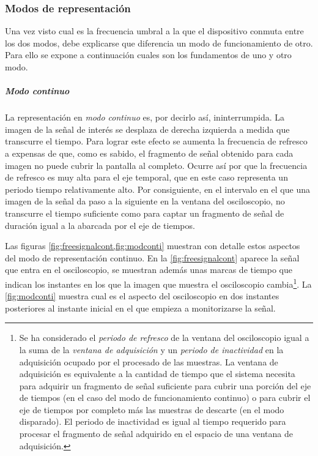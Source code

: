 \subsubsection{Modos de representación}

Una vez visto cual es la frecuencia umbral a la que el dispositivo conmuta
entre los dos modos, debe explicarse que diferencia un modo de
funcionamiento de otro. Para ello se expone a continuación cuales son los
fundamentos de uno y otro modo.


\subparagraph{Modo continuo}

La representación en \emph{modo continuo} es, por decirlo así,
ininterrumpida. La imagen de la señal de interés se desplaza de derecha
izquierda a medida que transcurre el tiempo. Para lograr este efecto se
aumenta la frecuencia de refresco a expensas de que, como es sabido, el
fragmento de señal obtenido para cada imagen no puede cubrir la pantalla al
completo. Ocurre así por que la frecuencia de refresco es muy alta para el
eje temporal, que en este caso representa un periodo tiempo relativamente
alto. Por consiguiente, en el intervalo en el que una imagen de la señal da
paso a la siguiente en la ventana del osciloscopio, no transcurre el tiempo
suficiente como para captar un fragmento de señal de duración igual a la
abarcada por el eje de tiempos.

Las figuras \cref{fig:freesignalcont,fig:modconti} muestran con detalle
estos aspectos del modo de representación continuo. En la
\cref{fig:freesignalcont} aparece la señal que entra en el osciloscopio, se
muestran además unas marcas de tiempo que indican los instantes en los que
la imagen que muestra el osciloscopio cambia\footnote{Se ha considerado el
\emph{periodo de refresco} de la ventana del osciloscopio igual a la suma
de la \emph{ventana de adquisición} y un \emph{periodo de inactividad} en
la adquisición ocupado por el procesado de las muestras. La ventana de
adquisición es equivalente a la cantidad de tiempo que el sistema necesita
para adquirir un fragmento de señal suficiente para cubrir una porción del
eje de tiempos (en el caso del modo de funcionamiento continuo) o para
cubrir el eje de tiempos por completo más las muestras de descarte (en el
modo disparado). El periodo de inactividad es igual al tiempo requerido
para procesar el fragmento de señal adquirido en el espacio de una ventana
de adquisición.}. La \cref{fig:modconti} muestra cual es el aspecto del
osciloscopio en dos instantes posteriores al instante inicial en el que
empieza a monitorizarse la señal.

